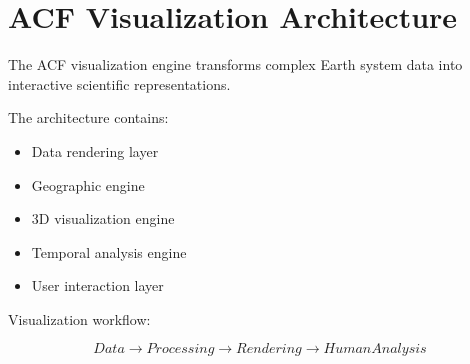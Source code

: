 \section{ACF Visualization Architecture}


The ACF visualization engine transforms complex Earth system
data into interactive scientific representations.


The architecture contains:


\begin{itemize}

\item Data rendering layer

\item Geographic engine

\item 3D visualization engine

\item Temporal analysis engine

\item User interaction layer

\end{itemize}



Visualization workflow:


\begin{equation}
Data
\rightarrow
Processing
\rightarrow
Rendering
\rightarrow
Human Analysis
\end{equation}
